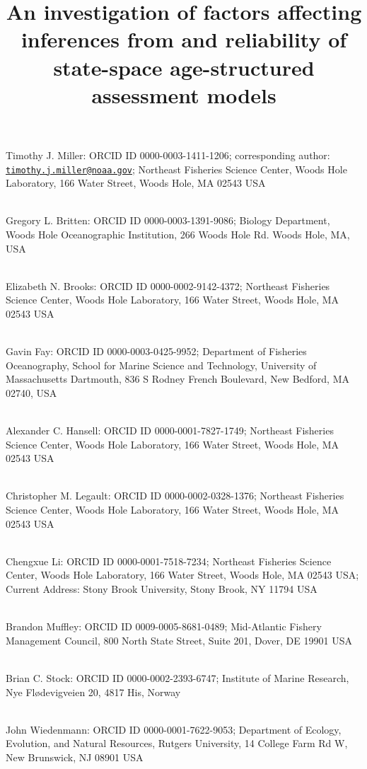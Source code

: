 \documentclass[
  12pt,
]{article}
\title{An investigation of factors affecting inferences from and
reliability of state-space age-structured assessment models}
\author{}
\date{\vspace{-2.5em}}
\begin{document}
\maketitle

Timothy J. Miller: ORCID ID 0000-0003-1411-1206; corresponding author:
\href{mailto:timothy.j.miller@noaa.gov}{\nolinkurl{timothy.j.miller@noaa.gov}};
Northeast Fisheries Science Center, Woods Hole Laboratory, 166 Water
Street, Woods Hole, MA 02543 USA\\
\strut \\
Gregory L. Britten: ORCID ID 0000-0003-1391-9086; Biology Department,
Woods Hole Oceanographic Institution, 266 Woods Hole Rd. Woods Hole, MA,
USA\\
\strut \\
Elizabeth N. Brooks: ORCID ID 0000-0002-9142-4372; Northeast Fisheries
Science Center, Woods Hole Laboratory, 166 Water Street, Woods Hole, MA
02543 USA\\
\strut \\
Gavin Fay: ORCID ID 0000-0003-0425-9952; Department of Fisheries
Oceanography, School for Marine Science and Technology, University of
Massachusetts Dartmouth, 836 S Rodney French Boulevard, New Bedford, MA
02740, USA\\
\strut \\
Alexander C. Hansell: ORCID ID 0000-0001-7827-1749; Northeast Fisheries
Science Center, Woods Hole Laboratory, 166 Water Street, Woods Hole, MA
02543 USA\\
\strut \\
Christopher M. Legault: ORCID ID 0000-0002-0328-1376; Northeast
Fisheries Science Center, Woods Hole Laboratory, 166 Water Street, Woods
Hole, MA 02543 USA\\
\strut \\
Chengxue Li: ORCID ID 0000-0001-7518-7234; Northeast Fisheries Science
Center, Woods Hole Laboratory, 166 Water Street, Woods Hole, MA 02543
USA; Current Address: Stony Brook University, Stony Brook, NY 11794
USA\\
\strut \\
Brandon Muffley: ORCID ID 0009-0005-8681-0489; Mid-Atlantic Fishery
Management Council, 800 North State Street, Suite 201, Dover, DE 19901
USA\\
\strut \\
Brian C. Stock: ORCID ID 0000-0002-2393-6747; Institute of Marine
Research, Nye Flødevigveien 20, 4817 His, Norway\\
\strut \\
John Wiedenmann: ORCID ID 0000-0001-7622-9053; Department of Ecology,
Evolution, and Natural Resources, Rutgers University, 14 College Farm Rd
W, New Brunswick, NJ 08901 USA\\
\end{document}
